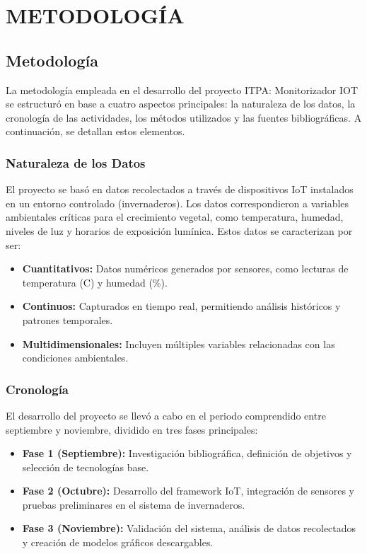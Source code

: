 \chapter{METODOLOGÍA}

\section{Metodología}

La metodología empleada en el desarrollo del proyecto ITPA: Monitorizador IOT se estructuró en base a cuatro aspectos principales: la naturaleza de los datos, la cronología de las actividades, los métodos utilizados y las fuentes bibliográficas. A continuación, se detallan estos elementos.

\subsection{Naturaleza de los Datos}
El proyecto se basó en datos recolectados a través de dispositivos IoT instalados en un entorno controlado (invernaderos). Los datos correspondieron a variables ambientales críticas para el crecimiento vegetal, como temperatura, humedad, niveles de luz y horarios de exposición lumínica. Estos datos se caracterizan por ser:
\begin{itemize}
    \item \textbf{Cuantitativos:} Datos numéricos generados por sensores, como lecturas de temperatura (\textdegree C) y humedad (\%).
    \item \textbf{Continuos:} Capturados en tiempo real, permitiendo análisis históricos y patrones temporales.
    \item \textbf{Multidimensionales:} Incluyen múltiples variables relacionadas con las condiciones ambientales.
\end{itemize}

\subsection{Cronología}
El desarrollo del proyecto se llevó a cabo en el periodo comprendido entre septiembre y noviembre, dividido en tres fases principales:
\begin{itemize}
    \item \textbf{Fase 1 (Septiembre):} Investigación bibliográfica, definición de objetivos y selección de tecnologías base.
    \item \textbf{Fase 2 (Octubre):} Desarrollo del framework IoT, integración de sensores y pruebas preliminares en el sistema de invernaderos.
    \item \textbf{Fase 3 (Noviembre):} Validación del sistema, análisis de datos recolectados y creación de modelos gráficos descargables.
\end{itemize}

